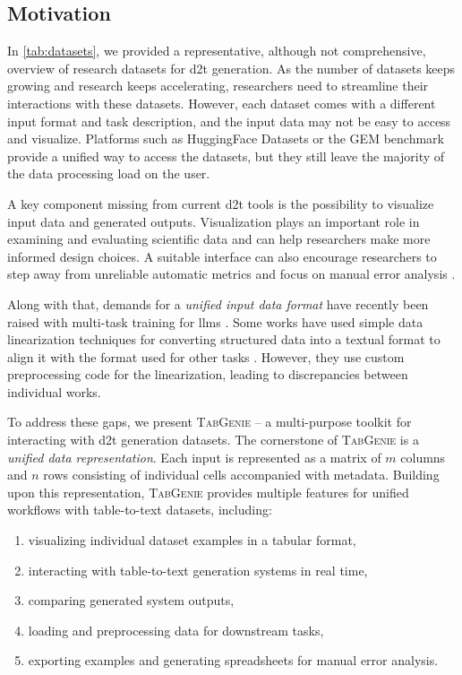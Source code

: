 \subsection{Motivation}
\label{sec:tabgenie:motivation}
In \autoref{tab:datasets}, we provided a representative, although not comprehensive, overview of research datasets for \ac{d2t} generation. As the number of datasets keeps growing and research keeps accelerating, researchers need to streamline their interactions with these datasets. However, each dataset comes with a different input format and task description, and the input data may not be easy to access and visualize.  Platforms such as HuggingFace Datasets \cite{lhoest2021datasets} or the GEM benchmark \cite{gehrmannGEMBenchmarkNatural2021}  provide a unified way to access the datasets, but they still leave the majority of the data processing load on the user.

A key component missing from current \ac{d2t} tools is the possibility to visualize input data and generated outputs. Visualization plays an important role in examining and evaluating scientific data \cite{Kehrer2013VisualizationAV} and can help researchers make more informed design choices. A suitable interface can also encourage researchers to step away from unreliable automatic metrics \cite{gehrmannRepairingCrackedFoundation2022} and focus on manual error analysis \cite{van_miltenburg_underreporting_2021,van_miltenburg_barriers_2023}.

Along with that, demands for a \textit{unified input data format} have recently been raised with multi-task training for \aclp{llm} \citep[\textit{inter alia}]{sanh2021multitask,scao2022bloom,ouyang2022TrainingLM}. Some works have used simple data linearization techniques for converting structured data into a textual format to align it with the format used for other tasks \cite{xieUnifiedSKGUnifyingMultiTasking2022,tang2022mvp}. However, they use custom preprocessing code for the linearization, leading to discrepancies between individual works.

To address these gaps, we present \textsc{TabGenie} -- a multi-purpose toolkit for interacting with \ac{d2t} generation datasets. The cornerstone of \textsc{TabGenie} is a \emph{unified data representation}. Each input is represented as a matrix of $m$ columns and $n$ rows consisting of individual cells accompanied with metadata. Building upon this representation, \textsc{TabGenie} provides multiple features for unified workflows with table-to-text datasets, including:
\begin{enumerate}
    \item visualizing individual dataset examples in a tabular format,
    \item interacting with table-to-text generation systems in real time,
    \item comparing generated system outputs,
    \item loading and preprocessing data for downstream tasks,
    \item exporting examples and generating spreadsheets for manual error analysis.
\end{enumerate}

